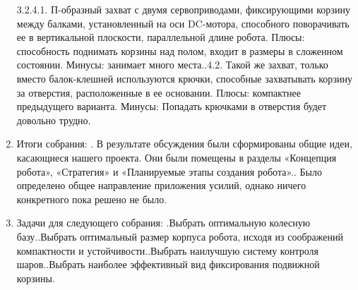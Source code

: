 \documentclass[12pt]{article}
\begin{document}
\begin{enumerate}
	      	3.2.4.1.	П-образный захват с двумя сервоприводами, фиксирующими корзину между балками, установленный на оси DC-мотора, способного поворачивать ее в вертикальной плоскости, параллельной длине робота. Плюсы: способность поднимать корзины над полом, входит в размеры в сложенном состоянии. Минусы: занимает много места..4.2.	Такой же захват, только вместо балок-клешней используются крючки, способные захватывать корзину за отверстия, расположенные в ее основании. Плюсы: компактнее предыдущего варианта. Минусы: Попадать крючками в отверстия будет довольно трудно.\newline
	        \item Итоги собрания:
	        .	В результате обсуждения были сформированы общие идеи, касающиеся нашего проекта. Они были помещены в разделы «Концепция робота»,  «Стратегия» и «Планируемые этапы создания робота»..	Было определено общее направление приложения усилий, однако ничего конкретного пока решено не было.
	        \newline
	        \item Задачи для следующего собрания:
	        .Выбрать оптимальную колесную базу..Выбрать оптимальный размер корпуса робота, исходя из соображений компактности и устойчивости..Выбрать наилучшую систему контроля шаров..Выбрать наиболее эффективный вид фиксирования подвижной корзины.\newline      
	      \end{enumerate}
\end{document}

